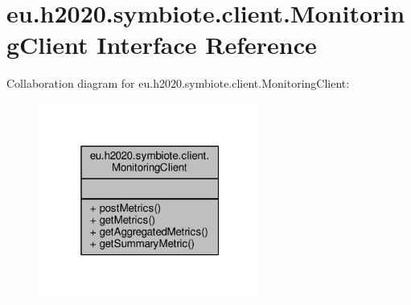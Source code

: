 \hypertarget{interfaceeu_1_1h2020_1_1symbiote_1_1client_1_1MonitoringClient}{}\section{eu.\+h2020.\+symbiote.\+client.\+Monitoring\+Client Interface Reference}
\label{interfaceeu_1_1h2020_1_1symbiote_1_1client_1_1MonitoringClient}


Collaboration diagram for eu.\+h2020.\+symbiote.\+client.\+Monitoring\+Client\+:
\nopagebreak
\begin{figure}[H]
\begin{center}
\leavevmode
\includegraphics[width=208pt]{interfaceeu_1_1h2020_1_1symbiote_1_1client_1_1MonitoringClient__coll__graph}
\end{center}
\end{figure}
